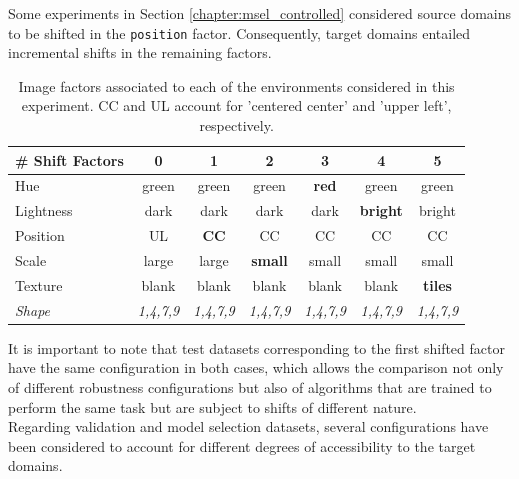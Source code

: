 \begin{definition} Some experiments in Section \ref{chapter:msel_controlled}
    considered source domains to be shifted in the \texttt{position} factor. Consequently, target
    domains entailed incremental shifts in the remaining factors.

    \begin{table}[H]
        \centering
        \begin{tabular}{l|c|c|c|c|c|c}
        \# Shift Factors & 0 & 1 & 2 & 3 & 4 & 5 \\
        \midrule
        Hue & green & green & green & \textbf{red} & green & green \\
        Lightness & dark & dark & dark & dark & \textbf{bright} & bright \\
        Position  & UL & \textbf{CC} & CC & CC & CC & CC \\
        Scale  & large & large & \textbf{small} & small & small & small\\
        Texture & blank & blank & blank & blank & blank & \textbf{tiles} \\
        \textit{Shape} & \textit{1,4,7,9} &  \textit{1,4,7,9} &  \textit{1,4,7,9} & \textit{1,4,7,9} & \textit{1,4,7,9} & \textit{1,4,7,9}\\
        \bottomrule
        \end{tabular}
        \caption{
        Image factors associated to each of the environments considered in this experiment. CC and UL account
        for 'centered center' and 'upper left', respectively.
        }
        \label{ds:pos_test}
    \end{table}
\end{definition}

It is important to note that test datasets corresponding to the first shifted factor have the same
configuration in both cases, which allows the comparison not only of different 
robustness configurations but also of algorithms that are trained to perform the same task but 
are subject to shifts of different nature. \\

Regarding validation and model selection datasets, several configurations have been considered to
account for different degrees of accessibility to the target domains.\\

\begin{definition}
    
    
\end{definition}

